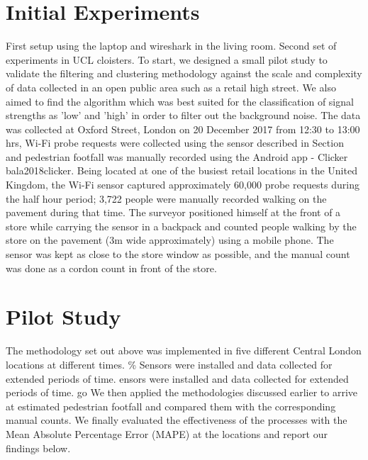 \section{Initial Experiments}

First setup using the laptop and wireshark in the living room.
Second set of experiments in UCL cloisters.
To start, we designed a small pilot study to validate the filtering and clustering methodology against the scale and complexity of data collected in an open public area such as a retail high street.
We also aimed to find the algorithm which was best suited for the classification of signal strengths as 'low' and 'high' in order to filter out the background noise.
The data was collected at Oxford Street, London on 20 December 2017 from 12:30 to 13:00 hrs, Wi-Fi probe requests were collected using the sensor described in Section and pedestrian footfall was manually recorded using the Android app - Clicker bala2018clicker.
Being located at one of the busiest retail locations in the United Kingdom, the Wi-Fi sensor captured approximately 60,000 probe requests during the half hour period; 3,722 people were manually recorded walking on the pavement during that time.
The surveyor positioned himself at the front of a store while carrying the sensor in a backpack and counted people walking by the store on the pavement (3m wide approximately) using a mobile phone.
The sensor was kept as close to the store window as possible, and the manual count was done as a cordon count in front of the store.

\section{Pilot Study}

The methodology set out above was implemented in five different Central London locations at different times.
\% Sensors were installed and data collected for extended periods of time.
ensors were installed and data collected for extended periods of time.
go
We then applied the methodologies discussed earlier to arrive at estimated pedestrian footfall and compared them with the corresponding manual counts.
We finally evaluated the effectiveness of the processes with the Mean Absolute Percentage Error (MAPE) at the locations and report our findings below.

